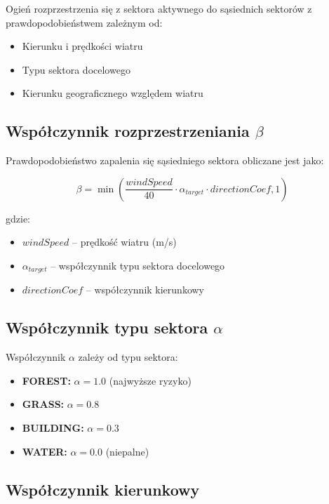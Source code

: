 \documentclass[11pt,a4paper]{article}
\begin{document}
Ogień rozprzestrzenia się z sektora aktywnego do sąsiednich sektorów z prawdopodobieństwem zależnym od:
\begin{itemize}
    \item Kierunku i prędkości wiatru
    \item Typu sektora docelowego
    \item Kierunku geograficznego względem wiatru
\end{itemize}

\subsection{Współczynnik rozprzestrzeniania $\beta$}

Prawdopodobieństwo zapalenia się sąsiedniego sektora obliczane jest jako:

\begin{equation}
\beta = \min(\frac{windSpeed}{40} \cdot \alpha_{target} \cdot directionCoef, 1)
\end{equation}

gdzie:
\begin{itemize}
    \item $windSpeed$ -- prędkość wiatru (m/s)
    \item $\alpha_{target}$ -- współczynnik typu sektora docelowego
    \item $directionCoef$ -- współczynnik kierunkowy 
\end{itemize}

\subsection{Współczynnik typu sektora $\alpha$}
\label{sec:alpha}

Współczynnik $\alpha$ zależy od typu sektora:
\begin{itemize}
    \item \textbf{FOREST:} $\alpha = 1.0$ (najwyższe ryzyko)
    \item \textbf{GRASS:} $\alpha = 0.8$
    \item \textbf{BUILDING:} $\alpha = 0.3$
    \item \textbf{WATER:} $\alpha = 0.0$ (niepalne)
\end{itemize}

\subsection{Współczynnik kierunkowy}
\label{sec:direction}
\end{document}
